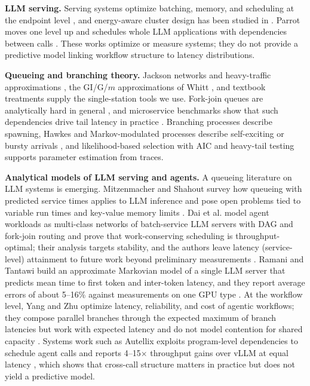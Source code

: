\documentclass[journal]{IEEEtran}
\begin{document}
\textbf{LLM serving.} Serving systems optimize batching, memory, and scheduling at the endpoint level \cite{kwon2023vllm,yu2022orca,agrawal2024sarathi,zhong2024distserve,patel2024splitwise}, and energy-aware cluster design has been studied in \cite{stojkovic2025dynamollm}. Parrot moves one level up and schedules whole LLM applications with dependencies between calls \cite{lin2024parrot}. These works optimize or measure systems; they do not provide a predictive model linking workflow structure to latency distributions.

\textbf{Queueing and branching theory.} Jackson networks and heavy-traffic approximations \cite{jackson1957networks,halfin1981heavy,kingman1961heavy}, the GI/G/$m$ approximations of Whitt \cite{whitt1993approx}, and textbook treatments \cite{harchol2013performance} supply the single-station tools we use. Fork-join queues are analytically hard in general \cite{baccelli1989acyclic,nelson1988forkjoin}, and microservice benchmarks show that such dependencies drive tail latency in practice \cite{gan2019deathstar}. Branching processes \cite{harris1963branching,athreya1972branching} describe spawning, Hawkes and Markov-modulated processes describe self-exciting or bursty arrivals \cite{hawkes1971spectra,bacry2015hawkes,fischer1993mmpp}, and likelihood-based selection with AIC \cite{akaike1974aic} and heavy-tail testing \cite{clauset2009power,mitzenmacher2004lognormal} supports parameter estimation from traces.

\textbf{Analytical models of LLM serving and agents.} A queueing literature on LLM systems is emerging. Mitzenmacher and Shahout survey how queueing with predicted service times applies to LLM inference and pose open problems tied to variable run times and key-value memory limits \cite{mitzenmacher2025queueing}. Dai et al. model agent workloads as multi-class networks of batch-service LLM servers with DAG and fork-join routing and prove that work-conserving scheduling is throughput-optimal; their analysis targets stability, and the authors leave latency (service-level) attainment to future work beyond preliminary measurements \cite{dai2025throughput}. Ramani and Tantawi build an approximate Markovian model of a single LLM server that predicts mean time to first token and inter-token latency, and they report average errors of about 5--16\% against measurements on one GPU type \cite{ramani2026approximate}. At the workflow level, Yang and Zhu optimize latency, reliability, and cost of agentic workflows; they compose parallel branches through the expected maximum of branch latencies but work with expected latency and do not model contention for shared capacity \cite{yang2026reliable}. Systems work such as Autellix exploits program-level dependencies to schedule agent calls and reports 4--15$\times$ throughput gains over vLLM at equal latency \cite{luo2025autellix}, which shows that cross-call structure matters in practice but does not yield a predictive model.
\end{document}
